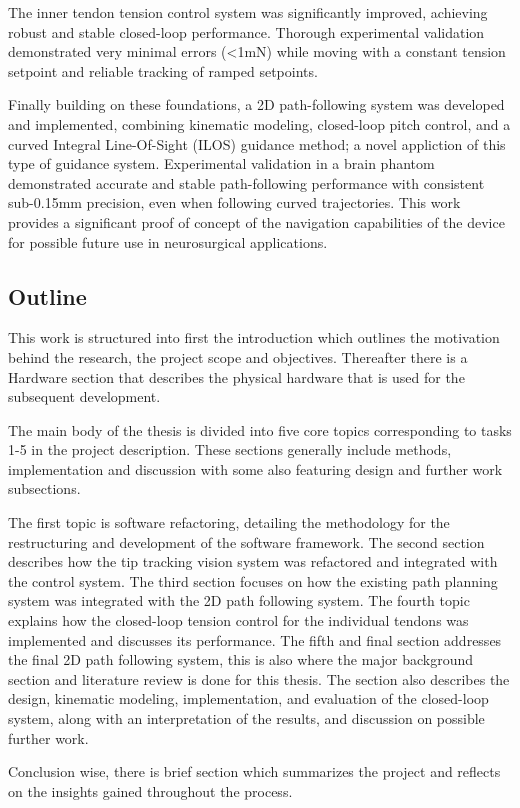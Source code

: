 The inner tendon tension control system was significantly improved, achieving robust and stable closed-loop performance. Thorough experimental validation demonstrated very minimal errors (<1mN) while moving with a constant tension setpoint and reliable tracking of ramped setpoints.

Finally building on these foundations, a 2D path-following system was developed and implemented, combining kinematic modeling, closed-loop pitch control, and a curved Integral Line-Of-Sight (ILOS) guidance method; a novel appliction of this type of guidance system. Experimental validation in a brain phantom demonstrated accurate and stable path-following performance with consistent sub-0.15mm precision, even when following curved trajectories. This work provides a significant proof of concept of the navigation capabilities of the device for possible future use in neurosurgical applications.


\subsection{Outline}
This work is structured into first the introduction which outlines the motivation behind the research, the project scope and objectives. Thereafter there is a Hardware section that describes the physical hardware that is used for the subsequent development.

The main body of the thesis is divided into five core topics corresponding to tasks 1-5 in the project description. These sections generally include methods, implementation and discussion with some also featuring design and further work subsections.

The first topic is software refactoring, detailing the methodology for the restructuring and development of the software framework. The second section describes how the tip tracking vision system was refactored and integrated with the control system. The third section focuses on how the existing path planning system was integrated with the 2D path following system. The fourth topic explains how the closed-loop tension control for the individual tendons was implemented and discusses its performance. The fifth and final section addresses the final 2D path following system, this is also where the major background section and literature review is done for this thesis. The section also describes the design, kinematic modeling, implementation, and evaluation of the closed-loop system, along with an interpretation of the results, and discussion on possible further work.

Conclusion wise, there is brief section which summarizes the project and reflects on the insights gained throughout the process.


